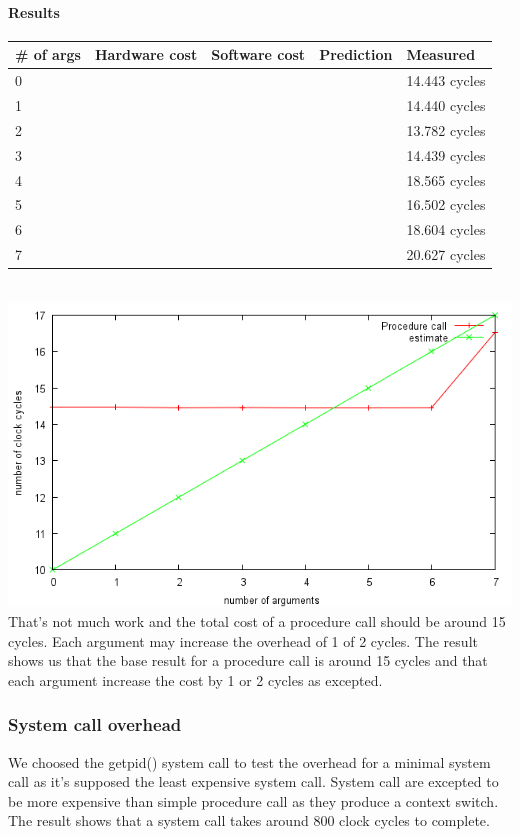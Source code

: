 \paragraph{Results}
\begin{tabular}{| l | l | l | l | l |}
\hline
\# of args & Hardware cost & Software cost & Prediction & Measured \\ \hline
0 &   &   &   & 14.443 cycles \\ \hline
1 &   &   &   & 14.440 cycles \\ \hline
2 &   &   &   & 13.782 cycles \\ \hline
3 &   &   &   & 14.439 cycles \\ \hline
4 &   &   &   & 18.565 cycles \\ \hline
5 &   &   &   & 16.502 cycles \\ \hline
6 &   &   &   & 18.604 cycles \\ \hline
7 &   &   &   & 20.627 cycles \\ \hline
\end{tabular} \\
\includegraphics{procCallImage}
That's not much work and the total cost of a procedure call should be around 15
cycles. Each argument may increase the overhead of 1 of 2 cycles.
The result shows us that the base result for a procedure call is around 15
cycles and that each argument increase the cost by 1 or 2 cycles as excepted.

\subsubsection{System call overhead}
We choosed the getpid() system call to test the overhead for a minimal system
call as it's supposed the least expensive system call.
System call are excepted to be more expensive than simple procedure call as they
produce a context switch.
The result shows that a system call takes around 800 clock cycles to complete.

